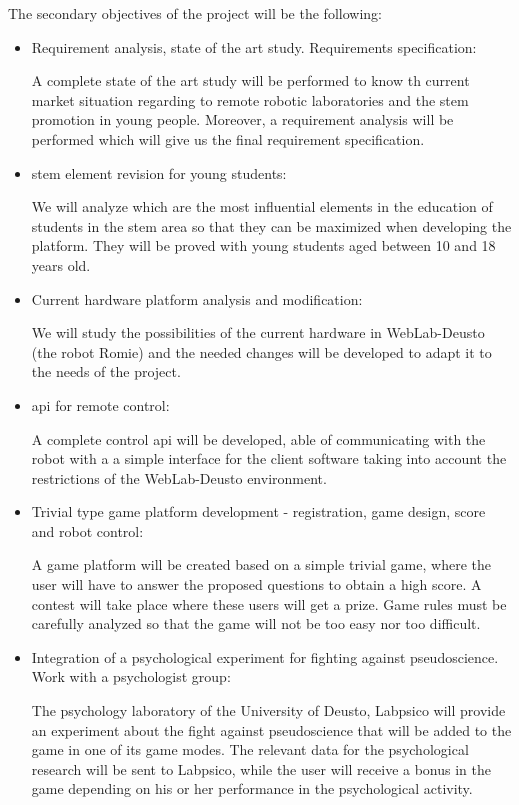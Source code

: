 The secondary objectives of the project will be the following:
\begin{itemize}
\item Requirement analysis, state of the art study. Requirements specification:

A complete state of the art study will be performed to know th current market situation regarding to
remote robotic laboratories and the \acrshort{stem} promotion in young people. Moreover, a
requirement analysis will be performed which will give us the final requirement specification.

\item \acrshort{stem} element revision for young students:

We will analyze which are the most influential elements in the education of students in the
\acrshort{stem} area so that they can be maximized when developing the platform. They will be proved
with young students aged between 10 and 18 years old.

\item Current hardware platform analysis and modification:

We will study the possibilities of the current hardware in WebLab-Deusto (the robot Romie) and the
needed changes will be developed to adapt it to the needs of the project.

\item \acrshort{api} for remote control:

A complete control \acrshort{api} will be developed, able of communicating with the robot with a
a simple interface for the client software taking into account the restrictions of the WebLab-Deusto
environment.

\item Trivial type game platform development - registration, game design, score and robot control:

A game platform will be created based on a simple trivial game, where the user will have to answer
the proposed questions to obtain a high score. A contest will take place where these users will get
a prize. Game rules must be carefully analyzed so that the game will not be too easy nor too
difficult.

\item Integration of a psychological experiment for fighting against pseudoscience. Work with a
psychologist group:

The psychology laboratory of the University of Deusto, Labpsico will provide an experiment about the
fight against pseudoscience that will be added to the game in one of its game modes. The relevant
data for the psychological research will be sent to Labpsico, while the user will receive a bonus in
the game depending on his or her performance in the psychological activity.


\end{itemize}
